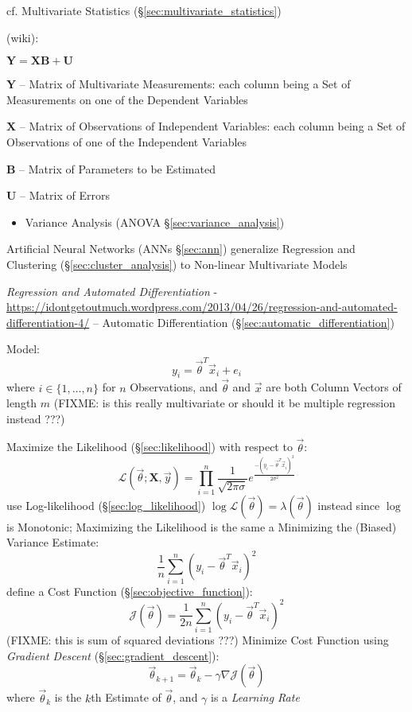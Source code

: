 cf. Multivariate Statistics (\S\ref{sec:multivariate_statistics})

(wiki):

$\mathbf{Y} = \mathbf{XB} + \mathbf{U}$

$\mathbf{Y}$ -- Matrix of Multivariate Measurements: each column being a Set of
Measurements on one of the Dependent Variables

$\mathbf{X}$ -- Matrix of Observations of Independent Variables: each column
being a Set of Observations of one of the Independent Variables

$\mathbf{B}$ -- Matrix of Parameters to be Estimated

$\mathbf{U}$ -- Matrix of Errors

\begin{itemize}
  \item Variance Analysis (ANOVA \S\ref{sec:variance_analysis})
\end{itemize}

\fist Artificial Neural Networks (ANNs \S\ref{sec:ann}) generalize Regression
and Clustering (\S\ref{sec:cluster_analysis}) to Non-linear Multivariate Models

\asterism

\emph{Regression and Automated Differentiation} -
\url{https://idontgetoutmuch.wordpress.com/2013/04/26/regression-and-automated-differentiation-4/}
-- Automatic Differentiation (\S\ref{sec:automatic_differentiation})

Model:
\[
  y_i = \vec{\theta}^T \vec{x}_i + e_i
\]
where $i \in \{1, \ldots, n\}$ for $n$ Observations, and $\vec{\theta}$ and
$\vec{x}$ are both Column Vectors of length $m$ (FIXME: is this really
multivariate or should it be multiple regression instead ???)

Maximize the Likelihood (\S\ref{sec:likelihood}) with respect to $\vec{\theta}$:
\[
  \mathcal{L}(\vec{\theta}; \mathbf{X}, \vec{y}) =
    \prod_{i=1}^n \frac{1}{\sqrt{2\pi\sigma}}
      e^\frac{-(y_i - \vec{\theta}^T \vec{x}_i)^2}{2\sigma^2}
\]
use Log-likelihood (\S\ref{sec:log_likelihood}) $\log \mathcal{L}(\vec{\theta})
= \lambda(\vec{\theta})$ instead since $\log$ is Monotonic; Maximizing the
Likelihood is the same a Minimizing the (Biased) Variance Estimate:
\[
  \frac{1}{n} \sum_{i=1}^n (y_i - \vec{\theta}^T\vec{x}_i)^2
\]
define a Cost Function (\S\ref{sec:objective_function}):
\[
  \mathcal{J}(\vec{\theta}) =
    \frac{1}{2n} \sum_{i=1}^n (y_i - \vec{\theta}^T \vec{x}_i)^2
\]
(FIXME: this is sum of squared deviations ???)
Minimize Cost Function using \emph{Gradient Descent}
(\S\ref{sec:gradient_descent}):
\[
  \vec{\theta}_{k+1} = \vec{\theta}_k - \gamma \nabla \mathcal{J}(\vec{\theta})
\]
where $\vec{\theta}_k$ is the $k$th Estimate of $\vec{\theta}$, and $\gamma$ is
a \emph{Learning Rate}

